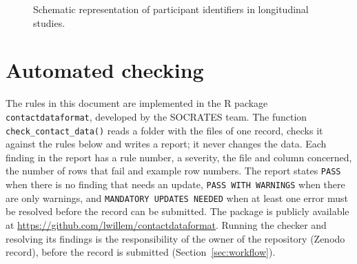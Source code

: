 \documentclass[11pt,a4paper]{article}
\begin{document}
\begin{figure}[H]
\centering
{}
\caption{Schematic representation of participant identifiers in longitudinal studies.}
\end{figure}

\section{Automated checking}
\label{sec:checker}
The rules in this document are implemented in the R package \texttt{contactdataformat}, developed by the SOCRATES team. The function \texttt{check\_contact\_data()} reads a folder with the files of one record, checks it against the rules below and writes a report; it never changes the data. Each finding in the report has a rule number, a severity, the file and column concerned, the number of rows that fail and example row numbers. The report states \texttt{PASS} when there is no finding that needs an update, \texttt{PASS WITH WARNINGS} when there are only warnings, and \texttt{MANDATORY UPDATES NEEDED} when at least one error must be resolved before the record can be submitted. The package is publicly available at \url{https://github.com/lwillem/contactdataformat}. Running the checker and resolving its findings is the responsibility of the owner of the repository (Zenodo record), before the record is submitted (Section~\ref{sec:workflow}).
\end{document}

